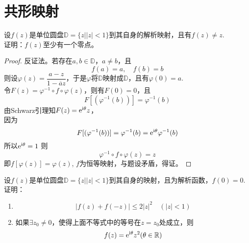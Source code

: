 \section{共形映射}

\begin{proposition}

    设$f(z)$是单位圆盘$\mathbb{D} = \{z \big| |z| < 1 \}$到其自身的解析映射，且有$f(z) \neq z$. \\
    证明：$f(z)$至少有一个零点。

\end{proposition}

\begin{proof}
    
    反证法。若存在$a, b \in \mathbb{D}$，$a \neq b$，且
    $$f(a) = a, \quad  f(b) = b$$
    则设$\varphi(z) = \dfrac{a - z}{1 - \overline{a}z}$，于是$\varphi$将$\mathbb{D}$映射成$\mathbb{D}$，且有$\varphi(0) = a$. \\
    令$F(z) = \varphi^{-1} \circ f \circ \varphi(z)$，则有$F(0) = 0$，且
    $$F[(\varphi^{-1}(b))] = \varphi^{-1}(b)$$
    由\textup{Schwarz}引理知$F(z) = \mathrm{e}^{\mathrm{i \theta}}z$，\\
    因为
    $$F[(\varphi^{-1}(b))] = \varphi^{-1}(b) = \mathrm{e}^{\mathrm{i \theta}}\varphi^{-1}(b)$$
    所以$ \mathrm{e}^{\mathrm{i \theta}} = 1$
    则
    $$ \varphi^{-1} \circ f \circ \varphi(z) = z$$
    即$ f[\varphi(z)] = \varphi(z)$, $f$为恒等映射，与题设矛盾，得证。

\end{proof}

\begin{proposition}
    
    设$f(z)$是单位圆盘$\mathbb{D} = \{z \big| |z| < 1 \}$到其自身的映射，且为解析函数，$f(0) = 0$. 证明：
    
    \begin{enumerate}
        
        \item   $$|f(z) + f(-z)| \leq 2 |z|^2 \quad (|z| < 1)$$
        
        \item   如果$\exists z_0 \neq 0$，使得上面不等式中的等号在$z = z_0$处成立，则
                $$f(z) = \mathrm{e}^{\mathrm{i}\theta}z^2(\theta \in \mathbb{{R}})$$

    \end{enumerate}

\end{proposition}

